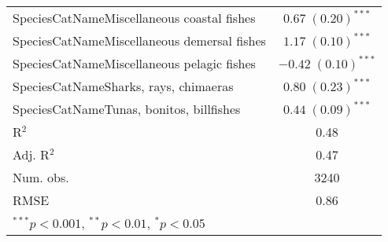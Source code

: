 \documentclass[]{article}
\begin{document}
\begin{table}[h]
\begin{center}
\begin{tabular}{l c }
SpeciesCatNameMiscellaneous coastal fishes  & $0.67 \; (0.20)^{***}$  \\
SpeciesCatNameMiscellaneous demersal fishes & $1.17 \; (0.10)^{***}$  \\
SpeciesCatNameMiscellaneous pelagic fishes  & $-0.42 \; (0.10)^{***}$ \\
SpeciesCatNameSharks, rays, chimaeras       & $0.80 \; (0.23)^{***}$  \\
SpeciesCatNameTunas, bonitos, billfishes    & $0.44 \; (0.09)^{***}$  \\
\hline
R$^2$                                       & 0.48                    \\
Adj. R$^2$                                  & 0.47                    \\
Num. obs.                                   & 3240                    \\
RMSE                                        & 0.86                    \\
\hline
\multicolumn{2}{l}{\scriptsize{$^{***}p<0.001$, $^{**}p<0.01$, $^*p<0.05$}}
\end{tabular}
\label{table:coefficients}
\end{center}
\end{table}
\end{document}
